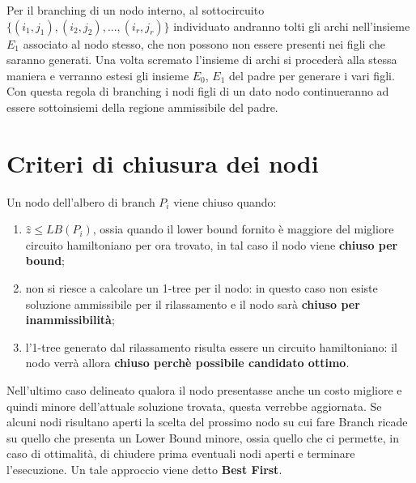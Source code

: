 \documentclass[
	article,			%
	12pt,				%
	oneside,			%
	a4paper,			%
	english,			%
	italian,				%
	sumario=tradicional,
	]{abntex2}
\begin{document}
\newline
Per il branching di un nodo interno, al sottocircuito $\{(i_1, j_1), (i_2,j_2),...,(i_r,j_r)\}$ individuato andranno tolti gli archi nell'insieme $E_1$ associato al nodo stesso, che non possono non essere presenti nei figli che saranno generati. Una volta scremato l'insieme di archi si procederà alla stessa maniera e verranno estesi gli insieme $E_0$, $E_1$ del padre per generare i vari figli.
\newline
Con questa regola di branching i nodi figli di un dato nodo continueranno ad essere sottoinsiemi della regione ammissibile del padre.

\section{Criteri di chiusura dei nodi}
Un nodo dell'albero di branch $P_i$ viene chiuso quando:
\begin{enumerate}
    \item $\hat{z} \leq LB(P_i)$, ossia quando il lower bound fornito è maggiore del migliore circuito hamiltoniano per ora trovato, in tal caso il nodo viene \textbf{chiuso per bound};
    \item non si riesce a calcolare un 1-tree per il nodo: in questo caso non esiste soluzione ammissibile per il rilassamento e il nodo sarà \textbf{chiuso per inammissibilità};
    \item l'1-tree generato dal rilassamento risulta essere un circuito hamiltoniano: il nodo verrà allora \textbf{chiuso perchè possibile candidato ottimo}.
\end{enumerate}
Nell'ultimo caso delineato qualora il nodo presentasse anche un costo migliore e quindi minore dell'attuale soluzione trovata, questa verrebbe aggiornata.
\newline
Se alcuni nodi risultano aperti la scelta del prossimo nodo su cui fare Branch ricade su quello che presenta un Lower Bound minore, ossia quello che ci permette, in caso di ottimalità, di chiudere prima eventuali nodi aperti e terminare l'esecuzione. Un tale approccio viene detto \textbf{Best First}.
\end{document}
